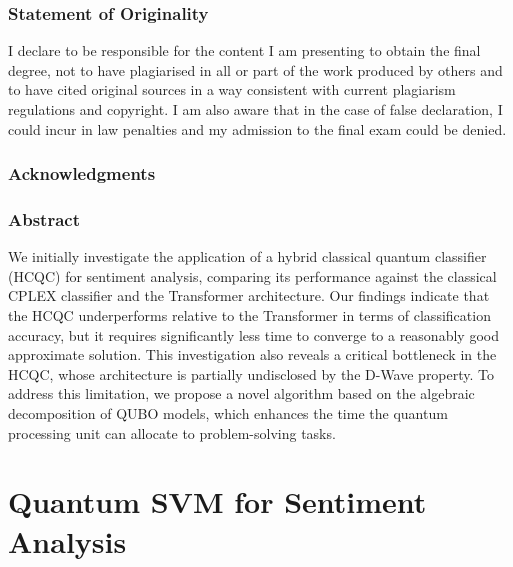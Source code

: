 \documentclass[11pt, oneside]{book}
\begin{document}

\newpage

\vfill
\section*{Statement of Originality}
I declare to be responsible for the content I am presenting to obtain the final degree, not to have plagiarised in all or part of the work produced by others and to have cited original sources in a way consistent with current plagiarism regulations and copyright. I am also aware that in the case of false declaration, I could incur in law penalties and my admission to the final exam could be denied.
\newpage

\section*{Acknowledgments}

\newpage

\section*{Abstract}
We initially investigate the application of a hybrid classical quantum classifier (HCQC) for sentiment analysis, comparing its performance against the classical CPLEX classifier and the Transformer architecture. 
Our findings indicate that the HCQC underperforms relative to the Transformer in terms of classification accuracy, but it requires significantly less time to converge to a reasonably good approximate solution. 
This investigation also reveals a critical bottleneck in the HCQC, whose architecture is partially undisclosed by the D-Wave property. 
To address this limitation, we propose a novel algorithm based on the algebraic decomposition of QUBO models, which enhances the time the quantum processing unit can allocate to problem-solving tasks.

\newpage

\tableofcontents
\newpage





\part{Quantum SVM for Sentiment Analysis}




\end{document}
